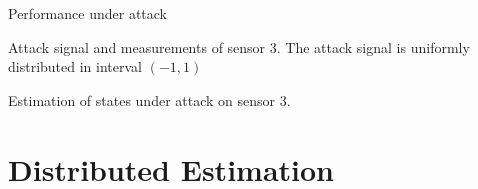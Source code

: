 \documentclass[10pt]{beamer}
\DeclareMathOperator{\1}{\textbf{1}}
\begin{document}
\begin{frame}{Performance under attack}
  \vspace{-30pt}
  \begin{figure}[ht]
    \centering
    \scalebox{0.65}{}
  \end{figure}
  \vspace{-10pt}
  \small Attack signal and measurements of sensor 3. The attack signal is uniformly distributed in interval $(-1,1)$
  \vspace{-10pt}
  \begin{figure}[ht]
    \centering
    \scalebox{0.65}{}
  \end{figure}
  \vspace{-10pt}
  Estimation of states under attack on sensor 3.
\end{frame}


\section{Distributed Estimation}

%
\end{document}
